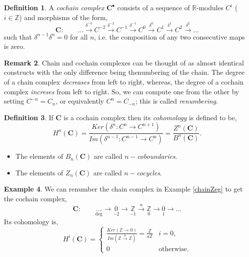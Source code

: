 \documentclass[11.5pt, twoside, a4paper, titlepage]{report}
\providecommand{\equ}[0]{\begin{equation*}}
\providecommand{\eequ}[0] {\end{equation*}}
\theoremstyle{definition}
\newtheorem{mydef}{Definition}[section]
\newtheorem{rem}[mydef]{Remark}
\newtheorem{eg}[mydef]{Example}
\theoremstyle{plain}
\begin{document}
\begin{mydef}
A \emph{cochain complex} $\mathbf{C}^{\bullet}$ consists of a sequence of $\mathbb{R}$-modules $C^i$ ($i \in \mathbb{Z}$) and morphisms of the form,
\begin{equation*}
\mathbf{C}: \qquad \dots \xrightarrow{\delta^{-3}} C^{-2} \xrightarrow{\delta^{-2}} C^{-1} \xrightarrow{\delta^{-1 }} C^0 \xrightarrow{\delta^0} C^{1} \xrightarrow{\delta^{1}} C^{2} \xrightarrow{\delta^{2}} \dots
\end{equation*}
such that $\delta^{n-1}\delta^{n}=0$ for all $n$, i.e. the composition of any two consecutive maps is zero.
\end{mydef}

\begin{rem}
Chain and cochain complexes can be thought of as almost identical constructs with the only difference being thenumbering of the chain. The degree of a chain complex \emph{decreases} from left to right, whereas, the degree of a cochain complex \emph{increses} from left to right. So, we can compute one from the other by setting $C^{-n}=C_n$, or equivalently $C^n=C_{-n}$; this is called \emph{renumbering}.
\end{rem}

\begin{mydef}
If $\mathbf{C}$ is a cochain complex then its \emph{cohomology} is defined to be,
\begin{equation*}
H^n(\mathbf{C})=\frac{Ker(\delta^n:C^n \rightarrow C^{n+1})}{Im(\delta^{n-1}:C^{n-1} \rightarrow C^n)} =\frac{Z^n(\mathbf{C})}{B^n(\mathbf{C})}.
\end{equation*}
\begin{itemize}
\item The elements of $B_n(\mathbf{C})$ are called \emph{$n-$coboundaries}.
\item The elements of $Z_n(\mathbf{C})$ are called \emph{$n-$cocycles}.
\end{itemize}
\end{mydef}

\begin{eg}
We can renumber the chain complex in Example \ref{chainZeg} to get the cochain complex, 
\equ
\mathbf{C}: \qquad \underset{\text{deg}}{\dots} \xrightarrow{}\underset{-2}{0} \xrightarrow{} \underset{-1}{\mathbb{Z}} \xrightarrow{a}\underset{0}{\mathbb{Z}} \xrightarrow{} \underset{1}{0} \xrightarrow{}\dots 
\eequ
Its cohomology is,
\equ
H^i(\mathbf{C}) = 
\begin{cases}
\frac{Ker(\mathbb{Z}\xrightarrow{} 0)}{Im(\mathbb{Z}\xrightarrow{a}\mathbb{Z})}=\frac{\mathbb{Z}}{a\mathbb{Z}} & i=0,\\
0 & \text{otherwise}.
\end{cases}
\eequ
\end{eg}
\end{document}
